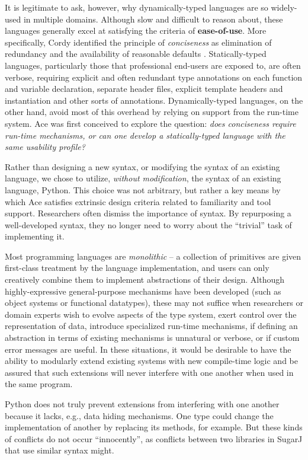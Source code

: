 \documentclass[10pt,preprint]{sigplanconf}
\begin{document}
{It is legitimate to ask, however, why dynamically-typed languages are so widely-used in multiple domains. Although slow and difficult to reason about, these languages generally excel at satisfying the criteria of \textbf{ease-of-use}. More specifically, Cordy identified the principle of \emph{conciseness} as elimination of
redundancy and the availability of reasonable defaults \cite{cordy1992hints}. Statically-typed languages, particularly those that professional end-users are exposed to, are often verbose, requiring explicit and often redundant type annotations on each function and variable declaration, separate header files, explicit template headers and  instantiation and other sorts of annotations.  Dynamically-typed languages, on the other hand, avoid most of this overhead by relying on support from the run-time system. Ace was first conceived to explore the question: \emph{does conciseness require run-time mechanisms, or can one develop a statically-typed language with the same usability profile?}


Rather than designing a new syntax, or modifying the syntax of an existing language, we chose to utilize, \emph{without modification}, the syntax of an existing language, Python. This choice was not arbitrary, but rather a key means by which Ace satisfies extrinsic design criteria related to familiarity and tool support. Researchers often dismiss the importance of syntax. By repurposing a well-developed syntax, they no longer need to worry about the ``trivial'' task of implementing it.

Most programming languages are {\em monolithic} -- a collection of primitives are given first-class treatment by the language implementation, and users can only creatively combine them to implement  abstractions of their design. Although highly-expressive general-purpose mechanisms have been developed (such as object systems or functional datatypes), these may not suffice when researchers or domain experts wish to evolve aspects of the type system, exert control over the representation of data, introduce specialized run-time mechanisms, if defining an abstraction in terms of existing mechanisms is unnatural or verbose, or if custom error messages are useful. In these situations, it would be desirable to have the ability to modularly extend existing systems with new compile-time logic and be assured that such extensions will never interfere with one another when used in the same program.

Python does not truly prevent extensions from interfering with one another because it lacks, e.g., data hiding mechanisms. One type could change the implementation of another by replacing its methods, for example. But these kinds of conflicts do not occur ``innocently'', as conflicts between two libraries in SugarJ that use similar syntax might.
 



}
\end{document}
